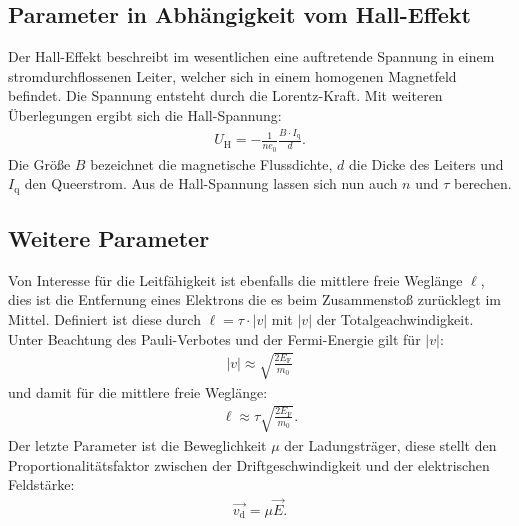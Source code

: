 \subsection{Parameter in Abhängigkeit vom Hall-Effekt}
Der Hall-Effekt beschreibt im wesentlichen eine auftretende Spannung in einem stromdurchflossenen Leiter, welcher sich in
einem homogenen Magnetfeld befindet. Die Spannung entsteht durch die Lorentz-Kraft.
Mit weiteren Überlegungen ergibt sich die Hall-Spannung:
\begin{align}
 U_\mathrm{H}=-\frac{1}{ne_0}\frac{B\cdot I_\mathrm{q}}{d}.
\end{align}
Die Größe $B$ bezeichnet die magnetische Flussdichte, $d$ die Dicke des Leiters und $I_\mathrm{q}$ den Queerstrom.
Aus de Hall-Spannung lassen sich nun auch $n$ und $\tau$ berechen.

\subsection{Weitere Parameter}
Von Interesse für die Leitfähigkeit ist ebenfalls die mittlere freie Weglänge $\ell$, dies ist die Entfernung eines Elektrons die
es beim Zusammenstoß zurücklegt im Mittel. Definiert ist diese durch $\ell=\tau\cdot|v|$ mit $|v|$ der Totalgeachwindigkeit.
Unter Beachtung des Pauli-Verbotes und der Fermi-Energie gilt für $|v|$:
\begin{align}
|v|\approx \sqrt{\frac{2E_\mathrm{F}}{m_0}}
\end{align}
und damit für die mittlere freie Weglänge:
\begin{align}
\ell \approx \tau\sqrt{\frac{2 E_\mathrm{F}}{m_0}}.
\end{align}
Der letzte Parameter ist die Beweglichkeit $\mu$ der Ladungsträger, diese stellt den Proportionalitätsfaktor
zwischen der Driftgeschwindigkeit und der elektrischen Feldstärke:
\begin{align}
\vec{v_\mathrm{d}}=\mu \vec{E}.
\end{align}
